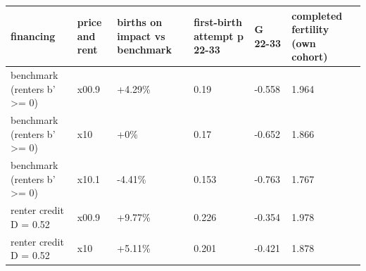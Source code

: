 \begingroup\small
\setlength{\tabcolsep}{3pt}
\renewcommand{\arraystretch}{1.04}
\begin{tabularx}{\linewidth}{XXXXXX}
\toprule
financing & price and rent & births on impact vs benchmark & first-birth attempt p 22-33 & G 22-33 & completed fertility (own cohort) \\
\midrule
benchmark (renters b' \textgreater{}= 0) & x00.9 & +4.29\% & 0.19 & -0.558 & 1.964 \\
benchmark (renters b' \textgreater{}= 0) & x10 & +0\% & 0.17 & -0.652 & 1.866 \\
benchmark (renters b' \textgreater{}= 0) & x10.1 & -4.41\% & 0.153 & -0.763 & 1.767 \\
renter credit D = 0.52 & x00.9 & +9.77\% & 0.226 & -0.354 & 1.978 \\
renter credit D = 0.52 & x10 & +5.11\% & 0.201 & -0.421 & 1.878 \\
\bottomrule
\end{tabularx}
\endgroup
